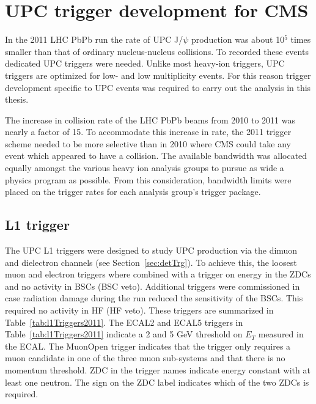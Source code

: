 \chapter{\label{ch:trigg}UPC trigger development for CMS}
  In the 2011 LHC PbPb run the rate of UPC J/$\psi$ production was about 
    10$^{5}$ times smaller than that of ordinary nucleus-nucleus collisions.
  To recorded these events dedicated UPC triggers were needed. 
  Unlike most heavy-ion triggers, UPC triggers are optimized for low-\pt{} 
    and low multiplicity events. 
  For this reason trigger development specific to UPC events was required to
    carry out the analysis in this thesis.

  The increase in collision rate of the LHC PbPb beams from 2010 to 2011 was
    nearly a factor of 15. 
  To accommodate this increase in rate, the 2011 trigger scheme needed to be 
    more selective than in 2010 where CMS could take any event which 
    appeared to have a collision.
  The available bandwidth was allocated equally amongst the various heavy ion
    analysis groups to pursue as wide a physics program as possible.
  From this consideration, bandwidth limits were placed on the trigger rates
    for each analysis group's trigger package. 
  
  \section{\label{sec:l1Trigger}L1 trigger}
    The UPC L1 triggers were designed to study UPC \JPsi{} production via the 
      dimuon and dielectron channels (see Section~\ref{sec:detTrg}).
    To achieve this, the loosest muon and electron triggers where combined with
      a trigger on energy in the ZDCs and no activity in BSCs (BSC veto).
    Additional triggers were commissioned in case radiation damage during the 
      run reduced the sensitivity of the BSCs.
    This required no activity in HF (HF veto). 
    These triggers are summarized in Table~\ref{tab:l1Triggers2011}.
    The ECAL2 and ECAL5 triggers in Table~\ref{tab:l1Triggers2011}
      indicate a 2 and 5 GeV threshold on $E_{T}$ measured in the ECAL.
    The MuonOpen trigger indicates that the trigger only 
      requires a muon candidate in one of the three muon sub-systems and that
      there is no momentum threshold.
    ZDC in the trigger names indicate energy constant with at least one neutron.
    The sign on the ZDC label indicates which of the two ZDCs is required. 

